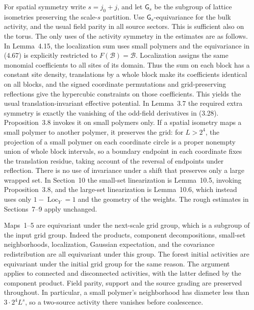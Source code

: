 \documentclass[11pt]{article}
\begin{document}
For spatial symmetry write \(s=j_0+j\), and let
\(\mathsf G_s\) be the subgroup of
lattice isometries preserving the scale-\(s\) partition.
Use \(\mathsf G_s\)-equivariance for the bulk activity, and
the usual field parity in all source sectors. This is sufficient
also on the torus. The only uses of the activity symmetry
in the estimates are as follows. In Lemma~4.15, the localization
sum uses small polymers and the equivariance in (4.67) is
explicitly restricted to \(F(\mathcal B)=\mathcal B\).
Localization assigns the same monomial coefficients to all
sites of its domain. Thus the sum on each block has a constant
site density, translations by a whole block make its
coefficients identical on all blocks, and the signed
coordinate permutations and grid-preserving reflections give
the hypercubic constraints on those coefficients. This yields
the usual translation-invariant effective potential.
In Lemma~3.7 the required extra symmetry is exactly the
vanishing of the odd-field derivatives in (3.28).
Proposition~3.8 invokes it on small polymers only. If a
spatial isometry maps a small polymer to another polymer,
it preserves the grid: for \(L>2^4\), the projection of
a small polymer on each coordinate circle is a proper
nonempty union of whole block intervals, so a boundary
endpoint in each coordinate fixes the translation residue,
taking account of the reversal of endpoints under reflection.
There is no use of invariance under a shift that preserves
only a large wrapped set. In Section~10 the small-set
linearization is Lemma~10.5, invoking Proposition~3.8, and
the large-set linearization is Lemma~10.6, which instead
uses only \(1-\operatorname{Loc}_Y=1\) and the geometry
of the weights. The rough estimates in Sections~7--9
apply unchanged.

Maps~1--5 are equivariant under the next-scale grid
group, which is a subgroup of the input grid group.
Indeed the products, component decompositions, small-set
neighborhoods, localization, Gaussian expectation,
and the covariance redistribution are all equivariant
under this group. The forest initial activities are
equivariant under the initial grid group for the same
reason. The argument applies to connected and disconnected
activities, with the latter defined by the component
product. Field parity, support and the source grading
are preserved throughout. In particular, a small polymer's
neighborhood has diameter less than \(3\cdot2^4 L^s\),
so a two-source activity there vanishes before coalescence.
\end{document}
